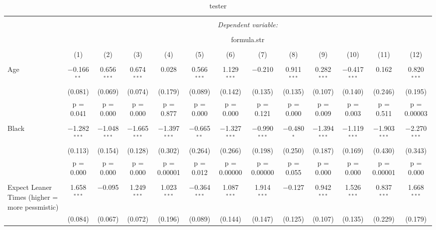 
\begin{longtable}{@{\extracolsep{5pt}}lcccccccccccc} 
  \caption{tester} 
  \label{} 
\\[-1.8ex]\hline 
\endhead
\hline \\[-1.8ex] 
 & \multicolumn{12}{c}{\textit{Dependent variable:}} \\ 
\cline{2-13} 
\\[-1.8ex] & \multicolumn{12}{c}{formula.str} \\ 
\\[-1.8ex] & (1) & (2) & (3) & (4) & (5) & (6) & (7) & (8) & (9) & (10) & (11) & (12)\\ 
\hline \\[-1.8ex] 
 Age & $-$0.166$^{**}$ & 0.656$^{***}$ & 0.674$^{***}$ & 0.028 & 0.566$^{***}$ & 1.129$^{***}$ & $-$0.210 & 0.911$^{***}$ & 0.282$^{***}$ & $-$0.417$^{***}$ & 0.162 & 0.820$^{***}$ \\ 
  & (0.081) & (0.069) & (0.074) & (0.179) & (0.089) & (0.142) & (0.135) & (0.135) & (0.107) & (0.140) & (0.246) & (0.195) \\ 
  & p = 0.041 & p = 0.000 & p = 0.000 & p = 0.877 & p = 0.000 & p = 0.000 & p = 0.121 & p = 0.000 & p = 0.009 & p = 0.003 & p = 0.511 & p = 0.00003 \\ 
  & & & & & & & & & & & & \\ 
 Black & $-$1.282$^{***}$ & $-$1.048$^{***}$ & $-$1.665$^{***}$ & $-$1.397$^{***}$ & $-$0.665$^{**}$ & $-$1.327$^{***}$ & $-$0.990$^{***}$ & $-$0.480$^{*}$ & $-$1.394$^{***}$ & $-$1.119$^{***}$ & $-$1.903$^{***}$ & $-$2.270$^{***}$ \\ 
  & (0.113) & (0.154) & (0.128) & (0.302) & (0.264) & (0.266) & (0.198) & (0.250) & (0.187) & (0.169) & (0.430) & (0.343) \\ 
  & p = 0.000 & p = 0.000 & p = 0.000 & p = 0.00001 & p = 0.012 & p = 0.00000 & p = 0.00000 & p = 0.055 & p = 0.000 & p = 0.000 & p = 0.00001 & p = 0.000 \\ 
  & & & & & & & & & & & & \\ 
 Expect Leaner Times (higher = more pessmistic) & 1.658$^{***}$ & $-$0.095 & 1.249$^{***}$ & 1.023$^{***}$ & $-$0.364$^{***}$ & 1.087$^{***}$ & 1.914$^{***}$ & $-$0.127 & 0.942$^{***}$ & 1.526$^{***}$ & 0.837$^{***}$ & 1.668$^{***}$ \\ 
  & (0.084) & (0.067) & (0.072) & (0.196) & (0.089) & (0.144) & (0.147) & (0.125) & (0.107) & (0.135) & (0.229) & (0.179) \\ 

\end{longtable}
